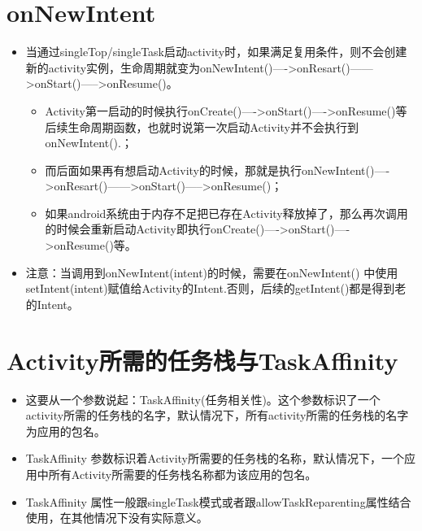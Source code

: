 \documentclass[9pt, b5paaper]{book}
\begin{document}
\section{onNewIntent}
\label{sec-4-8}
\begin{itemize}
\item 当通过singleTop/singleTask启动activity时，如果满足复用条件，则不会创建新的activity实例，生命周期就变为onNewIntent()---->onResart()------>onStart()----->onResume()。
\begin{itemize}
\item Activity第一启动的时候执行onCreate()---->onStart()---->onResume()等后续生命周期函数，也就时说第一次启动Activity并不会执行到onNewIntent().；
\item 而后面如果再有想启动Activity的时候，那就是执行onNewIntent()---->onResart()------>onStart()----->onResume()；
\item 如果android系统由于内存不足把已存在Activity释放掉了，那么再次调用的时候会重新启动Activity即执行onCreate()---->onStart()---->onResume()等。
\end{itemize}
\item 注意：当调用到onNewIntent(intent)的时候，需要在onNewIntent() 中使用setIntent(intent)赋值给Activity的Intent.否则，后续的getIntent()都是得到老的Intent。
\end{itemize}

\section{Activity所需的任务栈与TaskAffinity}
\label{sec-4-9}
\begin{itemize}
\item 这要从一个参数说起：TaskAffinity(任务相关性)。这个参数标识了一个activity所需的任务栈的名字，默认情况下，所有activity所需的任务栈的名字为应用的包名。
\item TaskAffinity 参数标识着Activity所需要的任务栈的名称，默认情况下，一个应用中所有Activity所需要的任务栈名称都为该应用的包名。
\item TaskAffinity 属性一般跟singleTask模式或者跟allowTaskReparenting属性结合使用，在其他情况下没有实际意义。
\end{itemize}
\end{document}
